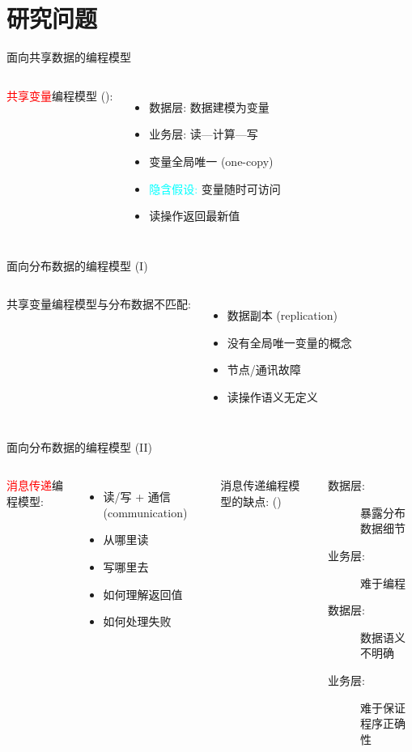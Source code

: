 \section{研究问题}

\begin{frame}{面向共享数据的编程模型}
  \begin{columns}
      \textcolor{red}{共享变量}编程模型 (): 
      \begin{itemize}
	\item 数据层: 数据建模为变量
	\item 业务层: 读---计算---写
	\item 变量全局唯一 (one-copy)
	\item \textcolor{cyan}{\footnotesize 隐含假设:} 变量随时可访问
	\item 读操作返回最新值 
      \end{itemize}
  \end{columns}
\end{frame}
\begin{frame}{面向分布数据的编程模型 (I)}
  \begin{columns}
      共享变量编程模型与分布数据不匹配:
      \begin{itemize}
	\item 数据副本 (replication)
	\item 没有全局唯一变量的概念
	\item 节点/通讯故障
	\item 读操作语义无定义
      \end{itemize}
  \end{columns}
\end{frame}
\begin{frame}{面向分布数据的编程模型 (II)}
  \begin{columns}[t]
      \textcolor{red}{消息传递}编程模型:
      \begin{itemize}
	\item 读/写 + 通信 (communication)
	\item 从哪里读
	\item 写哪里去
	\item 如何理解返回值
	\item 如何处理失败
      \end{itemize}
      \pause
      消息传递编程模型的缺点: ()
      \begin{description}
	\item[数据层:] 暴露分布数据细节
	\item[业务层:] 难于编程
	\item[数据层:] 数据语义不明确
	\item[业务层:] 难于保证程序正确性
      \end{description}
  \end{columns}
\end{frame}
